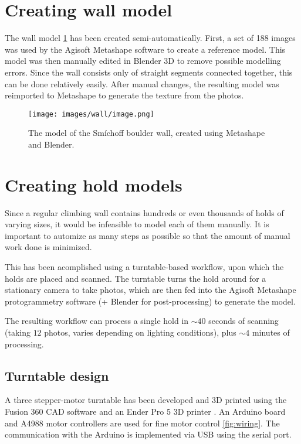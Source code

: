 \section{Creating wall model}
The wall model \ref{fig:model} has been created semi-automatically.
First, a set of 188 images was used by the Agisoft Metashape software to create a reference model.
This model was then manually edited in Blender 3D to remove possible modelling errors.
Since the wall consists only of straight segments connected together, this can be done relatively easily.
After manual changes, the resulting model was reimported to Metashape to generate the texture from the photos.

\begin{figure}
	\centering
	\texttt{[image: images/wall/image.png]}
	\caption{The model of the Smíchoff boulder wall, created using Metashape and Blender.}
	\label{fig:model}
\end{figure}


\section{Creating hold models}
Since a regular climbing wall contains hundreds or even thousands of holds of varying sizes, it would be infeasible to model each of them manually.
It is important to automize as many steps as possible so that the amount of manual work done is minimized.

This has been acomplished using a turntable-based workflow, upon which the holds are placed and scanned.
The turntable turns the hold around for a stationary camera to take photos, which are then fed into the Agisoft Metashape protogrammetry software (+ Blender for post-processing) to generate the model.

The resulting workflow can process a single hold in $\sim 40$ seconds of scanning (taking $12$ photos, varies depending on lighting conditions), plus  $\sim4$ minutes of processing.

\subsection{Turntable design}
A three stepper-motor turntable has been developed and 3D printed using the Fusion 360 CAD software and an Ender Pro 5 3D printer \label{ref:turntable}.
An Arduino board and A4988 motor controllers are used for fine motor control \ref{fig:wiring}.
The communication with the Arduino is implemented via USB using the serial port.

